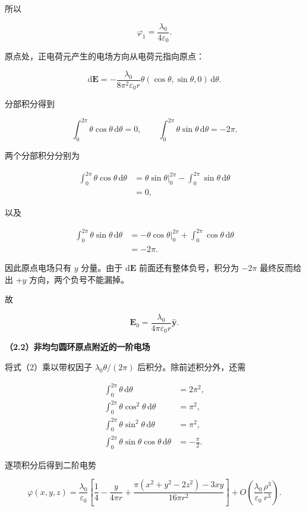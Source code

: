 \documentclass[12pt,a4paper,UTF8]{ctexart}
\begin{document}
所以

\[\boxed{\varphi_1=\frac{\lambda_0}{4\varepsilon_0}}. \tag{6}\]

原点处，正电荷元产生的电场方向从电荷元指向原点：

\[\mathrm d\boldsymbol E
=-\frac{\lambda_0}{8\pi^2\varepsilon_0r}
\theta(\cos\theta,\sin\theta,0)\,\mathrm d\theta.\]

分部积分得到

\[\int_0^{2\pi}\theta\cos\theta\,\mathrm d\theta=0,\qquad
\int_0^{2\pi}\theta\sin\theta\,\mathrm d\theta=-2\pi.\]

两个分部积分分别为

\[\begin{aligned}
\int_0^{2\pi}\theta\cos\theta\,\mathrm d\theta
&=\left.\theta\sin\theta\right|_0^{2\pi}
-\int_0^{2\pi}\sin\theta\,\mathrm d\theta\\
&=0,
\end{aligned}\]

以及

\[\begin{aligned}
\int_0^{2\pi}\theta\sin\theta\,\mathrm d\theta
&=\left.-\theta\cos\theta\right|_0^{2\pi}
+\int_0^{2\pi}\cos\theta\,\mathrm d\theta\\
&=-2\pi.
\end{aligned}\]

因此原点电场只有 \(y\) 分量。由于 \(\mathrm d\boldsymbol E\)
前面还有整体负号，积分为 \(-2\pi\) 最终反而给出 \(+y\)
方向，两个负号不能漏掉。

故

\[\boxed{
\boldsymbol E_0=\frac{\lambda_0}{4\pi\varepsilon_0r}
\hat{\boldsymbol y}
}. \tag{7}\]

\textbf{（2.2）非均匀圆环原点附近的一阶电场}

将式（2）乘以带权因子 \(\lambda_0\theta/(2\pi)\)
后积分。除前述积分外，还需

\[\begin{aligned}
\int_0^{2\pi}\theta\,\mathrm d\theta&=2\pi^2,\\
\int_0^{2\pi}\theta\cos^2\theta\,\mathrm d\theta&=\pi^2,\\
\int_0^{2\pi}\theta\sin^2\theta\,\mathrm d\theta&=\pi^2,\\
\int_0^{2\pi}\theta\sin\theta\cos\theta\,\mathrm d\theta&=-\frac\pi2.
\end{aligned}\]

逐项积分后得到二阶电势

\[\boxed{
\varphi(x,y,z)=\frac{\lambda_0}{\varepsilon_0}
\left[
\frac14-\frac{y}{4\pi r}
+\frac{\pi(x^2+y^2-2z^2)-3xy}{16\pi r^2}
\right]+O\!\left(\frac{\lambda_0}{\varepsilon_0}\frac{\rho^3}{r^3}\right)
}. \tag{8}\]
\end{document}
